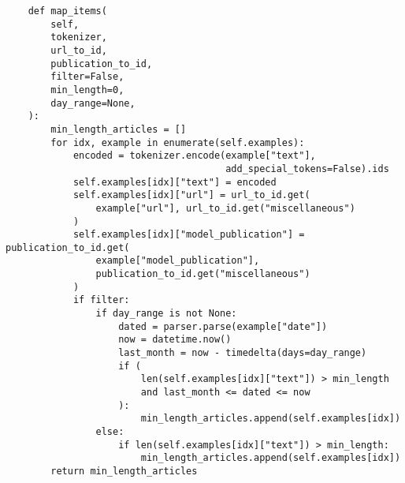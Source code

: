 \begin{verbatim}
    def map_items(
        self,
        tokenizer,
        url_to_id,
        publication_to_id,
        filter=False,
        min_length=0,
        day_range=None,
    ):
        min_length_articles = []
        for idx, example in enumerate(self.examples):
            encoded = tokenizer.encode(example["text"], 
                                       add_special_tokens=False).ids
            self.examples[idx]["text"] = encoded
            self.examples[idx]["url"] = url_to_id.get(
                example["url"], url_to_id.get("miscellaneous")
            )
            self.examples[idx]["model_publication"] = publication_to_id.get(
                example["model_publication"], 
                publication_to_id.get("miscellaneous")
            )
            if filter:
                if day_range is not None:
                    dated = parser.parse(example["date"])
                    now = datetime.now()
                    last_month = now - timedelta(days=day_range)
                    if (
                        len(self.examples[idx]["text"]) > min_length
                        and last_month <= dated <= now
                    ):
                        min_length_articles.append(self.examples[idx])
                else:
                    if len(self.examples[idx]["text"]) > min_length:
                        min_length_articles.append(self.examples[idx])
        return min_length_articles

\end{verbatim}